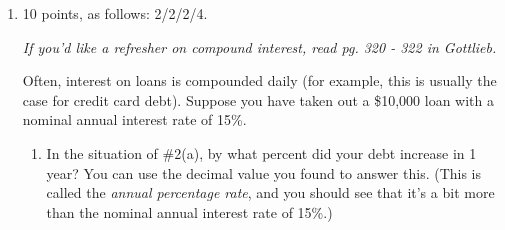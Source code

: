 \documentclass{article}
\begin{document}
\begin{enumerate}
\begin{enumerate}
    \item
      \begin{problem}[\vfill]
        $\displaystyle \lim_{x\to0^+} e^{-x} \ln x\vphantom{\frac{1}{1}}$
      \end{problem}

      \begin{solution}
        As $x \to 0^+$, $e^{-x} \to 1$ and $\ln x \to -\infty$, so this
        limit is $\boxed{-\infty}$. 
      \end{solution}

    \end{enumerate}

    \probonly{}


\item 

\begin{grading}
10 points, as follows: 2/2/2/4.
\end{grading}


\emph{If you'd like a refresher on compound interest, read
      pg. 320 - 322 in Gottlieb.}

  Often, interest on loans is compounded daily (for example, this is
  usually the case for credit card debt).  Suppose you have taken out a
  \$10,000 loan with a nominal annual interest rate of 15\%.
  \begin{enumerate}
  \calcitem
\begin{problem}[\vfill]
      If the interest on the loan is compounded daily and you make no
      payments, how much will you owe after 1 year (365 days)?  Write an exact expression, then use a calculator to find the decimal value to the nearest cent.
    \end{problem}
    \pspace{\newpage}

    \begin{solution} %
      Your debt will be multiplied by $1 + \frac{0.15}{365}$ every day, so
      the amount you will owe after a year is $\boxed{ 10000 \left( 1 +
          \frac{0.15}{365} \right)^{365} \approx \$ 11,617.98}$.
    \end{solution}

  \item
    \begin{problem}[\vfill]
      In the situation of {{{{\#2}}(a)}}, by what percent
      did your debt increase in 1 year? You can use the decimal value you found to answer this. (This is called the \emph{annual
        percentage rate}, and you should see that it's a bit more than the
      nominal annual interest rate of 15\%.)
    \end{problem}


\end{enumerate}
\end{enumerate}
\end{document}
